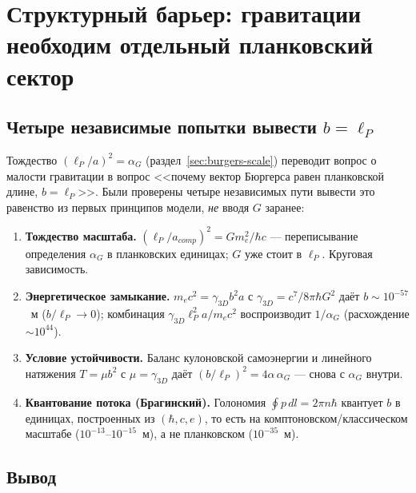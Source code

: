 

\section{Структурный барьер: гравитации необходим отдельный планковский сектор}
\label{sec:planck-sector}

\subsection{Четыре независимые попытки вывести \texorpdfstring{$b=\ell_P$}{b=lP}}

Тождество $(\ell_P/a)^2=\alpha_G$ (раздел~\ref{sec:burgers-scale})
переводит вопрос о малости гравитации в вопрос <<почему вектор Бюргерса
равен планковской длине, $b=\ell_P$>>. Были проверены четыре независимых
пути вывести это равенство из первых принципов модели, \emph{не} вводя
$G$ заранее:

\begin{enumerate}
\item \textbf{Тождество масштаба.} $(\ell_P/a_{comp})^2=Gm_e^2/\hbar c$ ---
      переписывание определения $\alpha_G$ в планковских единицах; $G$
      уже стоит в $\ell_P$. Круговая зависимость.
\item \textbf{Энергетическое замыкание.} $m_ec^2=\gamma_{3D}b^2a$ с
      $\gamma_{3D}=c^7/8\pi\hbar G^2$ даёт $b\sim10^{-57}$~м
      ($b/\ell_P\to0$); комбинация $\gamma_{3D}\ell_P^2a/m_ec^2$
      воспроизводит $1/\alpha_G$ (расхождение $\sim10^{44}$).
\item \textbf{Условие устойчивости.} Баланс кулоновской самоэнергии и
      линейного натяжения $T=\mu b^2$ с $\mu=\gamma_{3D}$ даёт
      $(b/\ell_P)^2=4\alpha\,\alpha_G$ --- снова с $\alpha_G$ внутри.
\item \textbf{Квантование потока (Брагинский).} Голономия
      $\oint p\,dl=2\pi n\hbar$ квантует $b$ в единицах, построенных из
      $(\hbar,c,e)$, то есть на комптоновском/классическом масштабе
      ($10^{-13}$--$10^{-15}$~м), а не планковском ($10^{-35}$~м).
\end{enumerate}

\subsection{Вывод}

